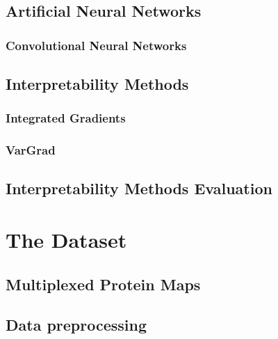 \documentclass[biblatexBackend=bibtex]{tumthesis}
\begin{document}
\section{Artificial Neural Networks}
\label{sec:basics:Cellular_Expression}

\subsection{Convolutional Neural Networks}
\label{sec:basics:CNN}

\section{Interpretability Methods}
\label{sec:basics:interpretability_methods}


\subsection{Integrated Gradients}
\label{sec:basics:IG}


\subsection{VarGrad}
\label{sec:basics:VarGrad}


\section{Interpretability Methods Evaluation}
\label{sec:basics:vgig_eval}

\chapter{The Dataset}
\label{ch:dataset}


\section{Multiplexed Protein Maps}
\label{sec:dataset:multiplexed_protein_maps}


\section{Data preprocessing}
\label{sec:dataset:data_pp}

\end{document}
